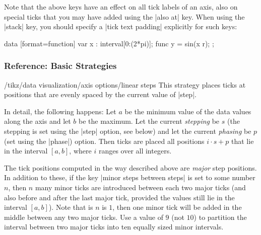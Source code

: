 Note that the above keys have an effect on all tick labels of an axis, also on
special ticks that you may have added using the |also at| key. When using the
|stack| key, you should specify a |tick text padding| explicitly for such keys:
%
\begin{codeexample}[
    width=7cm,
    preamble={\usetikzlibrary{datavisualization.formats.functions}},
]
\tikz \datavisualization
  [scientific axes,
   x axis={ticks={stack, many, major also at=
     {(pi) as [{tick text padding=2.5em}] $\pi$}}},
   visualize as smooth line]
  data [format=function] {
    var x : interval[0:(2*pi)];
    func y = sin(\value x r);
  };
\end{codeexample}


\subsubsection{Reference: Basic Strategies}
\label{section-dv-strategies}

\begin{key}{/tikz/data visualization/axis options/linear steps}
    This strategy places ticks at positions that are evenly spaced by the
    current value of |step|.

    In detail, the following happens: Let $a$ be the minimum value of the data
    values along the axis and let $b$ be the maximum. Let the current
    \emph{stepping} be $s$ (the stepping is set using the |step| option, see
    below) and let the current \emph{phasing} be $p$ (set using the |phase|)
    option. Then ticks are placed all positions $i\cdot s + p$ that lie in the
    interval $[a,b]$, where $i$ ranges over all integers.

    The tick positions computed in the way described above are \emph{major}
    step positions. In addition to these, if the key
    |minor steps between steps| is set to some number $n$, then $n$ many minor
    ticks are introduced between each two major ticks (and also before and
    after the last major tick, provided the values still lie in the interval
    $[a,b]$). Note that is $n$ is $1$, then one minor tick will be added in the
    middle between any two major ticks. Use a value of $9$ (not $10$) to
    partition the interval between two major ticks into ten equally sized minor
    intervals.
\begin{codeexample}[preamble={\usetikzlibrary{datavisualization}}]
\end{codeexample}
\end{key}

